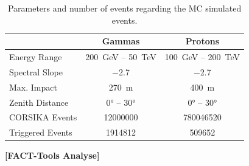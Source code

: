\begin{table}
  \centering%
  \begin{tabular}{l
                  c
                  c}
      \toprule
      {}    & Gammas  & Protons      \\
      \midrule
      Energy Range & \SI{200}{\GeV} – \SI{50}{\TeV} & \SI{100}{\GeV} – \SI{200}{\TeV} \\
      Spectral Slope & \num{-2.7} & \num{-2.7} \\
      Max. Impact & \SI{270}{\meter} & \SI{400}{\meter} \\
      Zenith Distance & \ang{0} – \ang{30} & \ang{0} – \ang{30} \\
      CORSIKA Events & \num{12000000} & \num{780046520}\\
      Triggered Events & \num{1914812} & \num{509652}\\
      \bottomrule
  \end{tabular}
  \caption{Parameters and number of events regarding the MC simulated events.}
  \label{tab:mcs}
\end{table}

\textbf{[FACT-Tools Analyse]}

